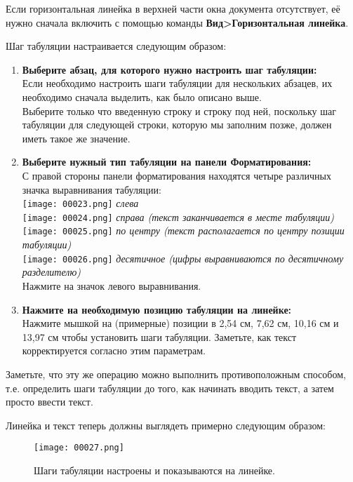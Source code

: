 ﻿\documentclass[a4paper,10pt]{article}
\begin{document}
Если горизонтальная линейка в верхней части окна документа отсутствует, её нужно сначала включить с помощью команды \textbf{Вид>Горизонтальная линейка}.

Шаг табуляции настраивается следующим образом:

\begin{enumerate}
 \item \textbf{Выберите абзац, для которого нужно настроить шаг табуляции:}\\
 Если необходимо настроить шаги табуляции для нескольких абзацев, их необходимо сначала выделить, как было описано выше.\\
Выберите только что введенную строку и строку под ней, поскольку шаг табуляции для следующей строки, которую мы заполним позже, должен иметь такое же значение.
\item \textbf{Выберите нужный тип табуляции на панели Форматирования:}\\
С правой стороны панели форматирования находятся четыре различных значка выравнивания табуляции:\\
\texttt{[image: 00023.png]} \textit{слева}\\
\texttt{[image: 00024.png]} \textit{справа (текст заканчивается в месте табуляции)}\\
\texttt{[image: 00025.png]} \textit{по центру (текст располагается по центру позиции табуляции)}\\
\texttt{[image: 00026.png]} \textit{десятичное (цифры выравниваются по десятичному разделителю)}\\
Нажмите на значок левого выравнивания.
\item \textbf{Нажмите на необходимую позицию табуляции на линейке:}\\
Нажмите мышкой на (примерные) позиции в 2,54 см, 7,62 см, 10,16 см и 13,97 см чтобы установить шаги табуляции. Заметьте, как текст корректируется согласно этим параметрам.
\end{enumerate}

Заметьте, что эту же операцию можно выполнить противоположным способом, т.е. определить шаги табуляции до того, как начинать вводить текст, а затем просто ввести текст.

Линейка и текст теперь должны выглядеть примерно следующим образом:

\begin{figure}[ht]
\texttt{[image: 00027.png]}
\centering
\caption{Шаги табуляции настроены и показываются на линейке.}
\end{figure}
\end{document}
